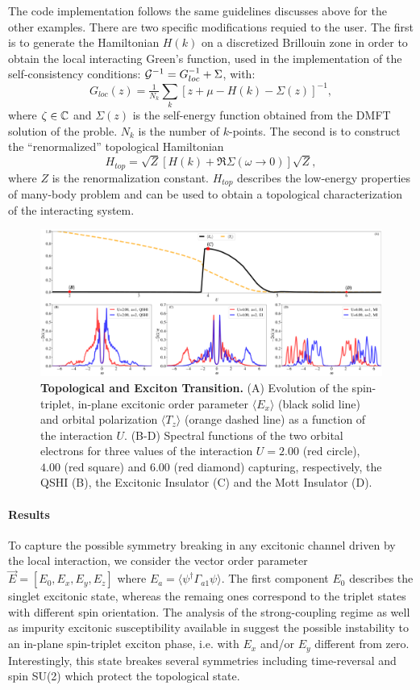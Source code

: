 \documentclass[edipack2.tex]{subfiles}
\begin{document}
The code implementation follows the same guidelines discusses above
for the other examples. There are two specific modifications requied
to the  user. The first is to generate the Hamiltonian $H(k)$ on a discretized Brillouin zone in
order to obtain the local interacting Green's function, used in the
implementation of the self-consistency conditions:
${\cal G}^{-1}=G_{loc}^{-1}+\Sigma$, with: 
$$
G_{loc}(z) = \tfrac{1}{N_k}\sum_k \left[z+\mu-H(k)-\Sigma(z)
\right]^{-1}, 
$$
where $\zeta\in\mathbb{C}$  and $\Sigma(z)$ is the self-energy function obtained from the DMFT
solution of the proble.  $N_k$ is the number of $k$-points. 
The second is to  construct the ``renormalized'' topological
Hamiltonian
$$
H_{top} = \sqrt{Z}[H(k) + \Re\Sigma(\omega\to0)]\sqrt{Z}, 
$$
where $Z$ is the renormalization constant. $H_{top}$ describes the
low-energy properties of many-body problem and can be used to obtain a 
topological characterization of the interacting system.  



\begin{figure}[t!]
  \includegraphics[width=\linewidth]{figures/figBHZ.pdf}
    \caption{\label{figEx4}%
      \textbf{Topological and Exciton Transition.}
      (A) Evolution of the spin-triplet,
      in-plane excitonic order parameter $\langle E_x\rangle$ (black solid line) and
      orbital polarization $\langle T_z\rangle$ (orange dashed line) as a function of the
      interaction $U$.
      (B-D) Spectral functions of the two orbital electrons for three
      values of the interaction $U=2.00$ (red circle), $4.00$ (red
      square) and $6.00$ (red diamond) capturing, respectively, the
      QSHI (B), the Excitonic Insulator (C) and the Mott Insulator
      (D). 
    }
\end{figure}

\paragraph{Results}
To capture the possible symmetry breaking in any excitonic channel
driven by the local interaction, we consider the vector order
parameter
$\vec{E}=[E_0,E_x,E_y,E_z]$ where $E_a=\langle\psi^\dagger
\Gamma_{a1}\psi \rangle$.
The first component $E_0$ describes the singlet excitonic state,
whereas the remaing ones correspond to the triplet states with
different spin orientation.   
The analysis of the strong-coupling regime as well as impurity
excitonic susceptibility available in \NAME suggest the possible
instability to an in-plane spin-triplet exciton phase, i.e. with $E_x$
and/or $E_y$ different from zero.
Interestingly, this state breakes several symmetries including
time-reversal and spin SU(2) which protect the topological state.
\end{document}
